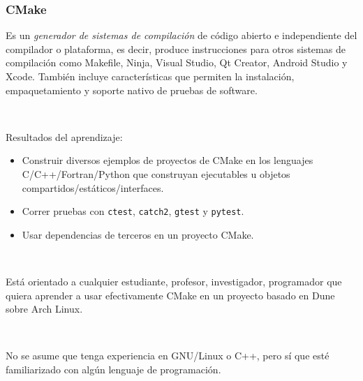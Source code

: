 




\begin{frame}[fragile]
	\frametitle{CMake}
	Es un \emph{generador de sistemas de compilación} de código
	abierto e independiente del compilador o plataforma, es decir,
	produce instrucciones para otros sistemas de compilación como
	Makefile, Ninja, Visual Studio, Qt Creator, Android Studio y
	Xcode.
	También incluye características que permiten la instalación,
	empaquetamiento y soporte nativo de pruebas de software.

	\
	
	Resultados del aprendizaje:

	\begin{itemize}
		\item

		Construir diversos ejemplos de proyectos de CMake en los
		lenguajes C/C++/Fortran/Python que construyan ejecutables u
		objetos compartidos/estáticos/interfaces.

		\item

		Correr pruebas con \lstinline{ctest}, \lstinline{catch2},
		\lstinline{gtest} y \lstinline{pytest}.

		\item

		Usar dependencias de terceros en un proyecto CMake.
	\end{itemize}

	\

	Está orientado a cualquier estudiante, profesor, investigador,
	programador que quiera aprender a usar efectivamente CMake en un
	proyecto basado en Dune sobre Arch Linux.

	\

	No se asume que tenga experiencia en GNU/Linux o C++, pero
	sí que esté familiarizado con algún lenguaje de programación.

\end{frame}

